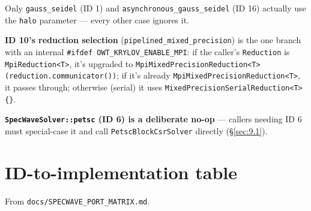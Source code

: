 \documentclass[11pt,a4paper]{report}
\newcommand{\secref}[1]{\S\ref{#1}}
\begin{document}
Only \lstinline!gauss_seidel! (ID 1) and \lstinline!asynchronous_gauss_seidel! (ID
16) actually use the \lstinline!halo! parameter --- every other case ignores
it.

\textbf{ID 10's reduction selection} (\lstinline!pipelined_mixed_precision!)
is the one branch with an internal \lstinline!#ifdef OWT_KRYLOV_ENABLE_MPI!:
if the caller's \lstinline!Reduction! is \lstinline!MpiReduction<T>!, it's upgraded
to \lstinline!MpiMixedPrecisionReduction<T>(reduction.communicator())!; if
it's already \lstinline!MpiMixedPrecisionReduction<T>!, it passes through;
otherwise (serial) it uses \lstinline!MixedPrecisionSerialReduction<T>{}!.

\textbf{\lstinline!SpecWaveSolver::petsc! (ID 6) is a deliberate no-op} ---
callers needing ID 6 must special-case it and call
\lstinline!PetscBlockCsrSolver! directly (\secref{sec:9.1}).

\section{ID-to-implementation table}
\label{sec:10.2}

From \texttt{docs/SPECWAVE\_PORT\_MATRIX.md}.
\end{document}
